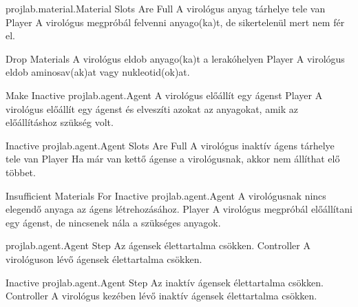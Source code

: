 \begin{use-case}
    {projlab.material.Material Slots Are Full}
    {A virológus anyag tárhelye tele van}
    {Player}
    A virológus megpróbál felvenni anyago(ka)t, de sikertelenül mert nem fér el.
\end{use-case}

\begin{use-case}
    {Drop Materials}
    {A virológus eldob anyago(ka)t a lerakóhelyen}
    {Player}
    A virológus eldob aminosav(ak)at vagy nukleotid(ok)at.
\end{use-case}

\begin{use-case}
    {Make Inactive projlab.agent.Agent}
    {A virológus előállít egy ágenst}
    {Player}
    A virológus előállít egy ágenst és elveszíti azokat az anyagokat, amik az előállításhoz szükség volt.
\end{use-case}

\begin{use-case}
    {Inactive projlab.agent.Agent Slots Are Full}
    {A virológus inaktív ágens tárhelye tele van}
    {Player}
    Ha már van kettő ágense a virológusnak, akkor nem állíthat elő többet.
\end{use-case}

\begin{use-case}
    {Insufficient Materials For Inactive projlab.agent.Agent}
    {A virológusnak nincs elegendő anyaga az ágens létrehozásához.}
    {Player}
    A virológus megpróbál előállítani egy ágenst, de nincsenek nála a szükséges anyagok.
\end{use-case}

\begin{use-case}
    {projlab.agent.Agent Step}
    {Az ágensek élettartalma csökken.}
    {Controller}
    A virológuson lévő ágensek élettartalma csökken.
\end{use-case}

\begin{use-case}
    {Inactive projlab.agent.Agent Step}
    {Az inaktív ágensek élettartalma csökken.}
    {Controller}
    A virológus kezében lévő inaktív ágensek élettartalma csökken.
\end{use-case}

